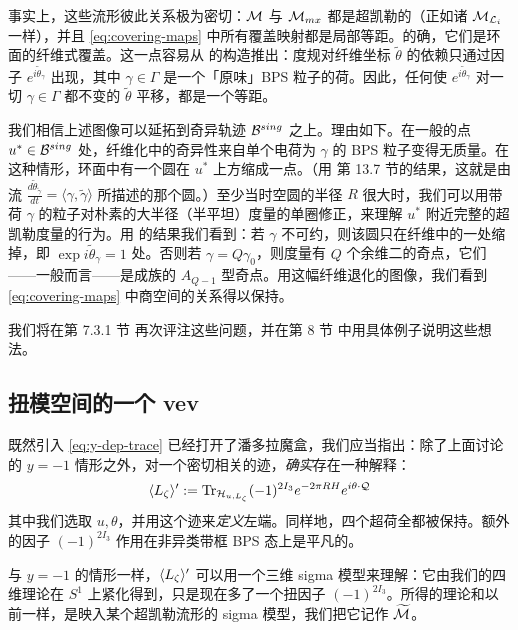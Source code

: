 事实上，这些流形彼此关系极为密切：$\mathcal{M}$ 与 $\mathcal{M}_{mx}$ 都是超凯勒的（正如诸 $\mathcal{M}_{\mathcal{L}_i}$ 一样），并且 \eqref{eq:covering-maps}
中所有覆盖映射都是局部等距。的确，它们是环面的纤维式覆盖。这一点容易从 \cite{Gaiotto:2008cd} 的构造推出：度规对纤维坐标 $\tilde\theta$ 的依赖只通过因子 $e^{i\tilde\theta_\gamma}$ 出现，其中 $\gamma\in\Gamma$ 是一个「原味」BPS 粒子的荷。因此，任何使 $e^{i\tilde\theta_\gamma}$ 对一切 $\gamma\in\Gamma$ 都不变的 $\tilde\theta$ 平移，都是一个等距。

我们相信上述图像可以延拓到奇异轨迹 $\mathcal{B}^{sing}$ 之上。理由如下。在一般的点 $u^*\in\mathcal{B}^{sing}$ 处，纤维化中的奇异性来自单个电荷为 $\gamma$ 的 BPS 粒子变得无质量。在这种情形，环面中有一个圆在 $u^*$ 上方缩成一点。（用 \cite{Gaiotto:2009hg} 第 13.7 节的结果，这就是由流 $\frac{d\tilde\theta_{\tilde \gamma}}{dt} = \langle \gamma, \tilde \gamma \rangle$ 所描述的那个圆。）至少当时空圆的半径 $R$ 很大时，我们可以用带荷 $\gamma$ 的粒子对朴素的大半径（半平坦）度量的单圈修正，来理解 $u^*$ 附近完整的超凯勒度量的行为。用 \cite{Gaiotto:2008cd} 的结果我们看到：若 $\gamma$ 不可约，则该圆只在纤维中的一处缩掉，即 $\exp i \tilde\theta_\gamma =1$ 处。否则若 $\gamma=Q\gamma_0$，则度量有 $Q$ 个余维二的奇点，它们——一般而言——是成族的 $A_{Q-1}$ 型奇点。用这幅纤维退化的图像，我们看到 \eqref{eq:covering-maps}
中商空间的关系得以保持。

我们将在第 7.3.1 节%
再次评注这些问题，并在第 8 节%
中用具体例子说明这些想法。


\subsection{扭模空间的一个 vev} \label{sec:twisted-vev}

既然引入 \eqref{eq:y-dep-trace}
已经打开了潘多拉魔盒，我们应当指出：除了上面讨论的 $y=-1$ 情形之外，对一个密切相关的迹，\emph{确实}存在一种解释：
\begin{equation}\label{eq:y=1-trace}
\langle L_\zeta \rangle' := {\rm Tr}_{\mathcal{H}_{u,L_\zeta}} (-1)^{2I_3} e^{-2 \pi R H} e^{i \theta \cdot \mathcal{Q}}
\end{equation}
其中我们选取 $u,\theta$，并用这个迹来\emph{定义}左端。同样地，四个超荷全都被保持。额外的因子 $(-1)^{2 I_3}$ 作用在非异类带框 BPS 态上是平凡的。

与 $y=-1$ 的情形一样，$\langle L_\zeta \rangle'$ 可以用一个三维 sigma 模型来理解：它由我们的四维理论在 $S^1$ 上紧化得到，只是现在多了一个扭因子 $(-1)^{2 I_3}$。所得的理论和以前一样，是映入某个超凯勒流形的 sigma 模型，我们把它记作 $\widetilde{\cal M}$。

